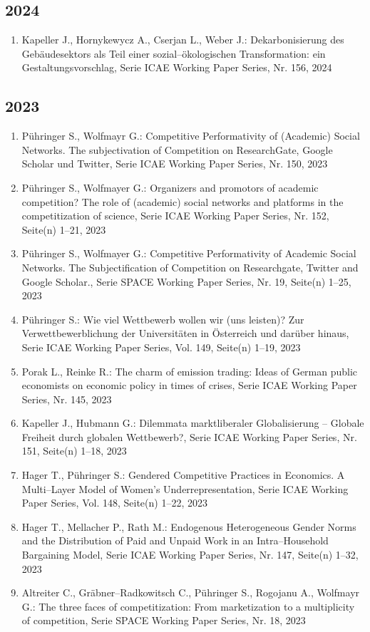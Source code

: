 \subsection*{2024}
\begin{enumerate}
    	 \item Kapeller J., Hornykewycz A., Cserjan L., Weber J.: Dekarbonisierung des Gebäudesektors als Teil einer sozial--ökologischen Transformation: ein Gestaltungsvorschlag, Serie ICAE Working Paper Series, Nr. 156, 2024
\end{enumerate}
\subsection*{2023}
\begin{enumerate}
    	 \item Pühringer S., Wolfmayr G.: Competitive Performativity of (Academic) Social Networks. The subjectivation of Competition on ResearchGate, Google Scholar und Twitter, Serie ICAE Working Paper Series, Nr. 150, 2023
	 \item Pühringer S., Wolfmayer G.: Organizers and promotors of academic competition? The role of (academic) social networks and platforms in the competitization of science, Serie ICAE Working Paper Series, Nr. 152, Seite(n) 1--21, 2023
	 \item Pühringer S., Wolfmayer G.: Competitive Performativity of Academic Social Networks. The Subjectification of Competition on Researchgate, Twitter and Google Scholar., Serie SPACE Working Paper Series, Nr. 19, Seite(n) 1--25, 2023
	 \item Pühringer S.: Wie viel Wettbewerb wollen wir (uns leisten)? Zur Verwettbewerblichung der Universitäten in Österreich und darüber hinaus, Serie ICAE Working Paper Series, Vol. 149, Seite(n) 1--19, 2023
	 \item Porak L., Reinke R.: The charm of emission trading: Ideas of German public economists on economic policy in times of crises, Serie ICAE Working Paper Series, Nr. 145, 2023
	 \item Kapeller J., Hubmann G.: Dilemmata marktliberaler Globalisierung – Globale Freiheit durch globalen Wettbewerb?, Serie ICAE Working Paper Series, Nr. 151, Seite(n) 1--18, 2023
	 \item Hager T., Pühringer S.: Gendered Competitive Practices in Economics. A Multi--Layer Model of Women’s Underrepresentation, Serie ICAE Working Paper Series, Vol. 148, Seite(n) 1--22, 2023
	 \item Hager T., Mellacher P., Rath M.: Endogenous Heterogeneous Gender Norms and the Distribution of Paid and Unpaid Work in an Intra--Household Bargaining Model, Serie ICAE Working Paper Series, Nr. 147, Seite(n) 1--32, 2023
	 \item Altreiter C., Gräbner--Radkowitsch C., Pühringer S., Rogojanu A., Wolfmayr G.: The three faces of competitization: From marketization to a multiplicity of competition, Serie SPACE Working Paper Series, Nr. 18, 2023
\end{enumerate}
